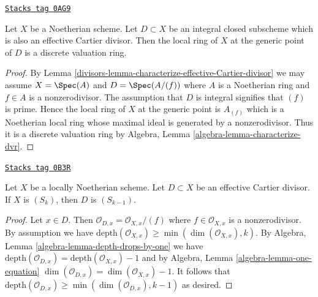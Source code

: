 \begin{lemma}
\label{divisors-lemma-integral-effective-Cartier-divisor-dvr}
\href{https://stacks.math.columbia.edu/tag/0AG9}{\texttt{Stacks tag 0AG9}}

Let $X$ be a Noetherian scheme. Let $D \subset X$ be an
integral closed subscheme which is also an
effective Cartier divisor. Then the local ring of $X$
at the generic point of $D$ is a discrete valuation ring.
\end{lemma}

\begin{proof}

By Lemma \ref{divisors-lemma-characterize-effective-Cartier-divisor}
we may assume $X = \Spec(A)$ and $D = \Spec(A/(f))$
where $A$ is a Noetherian ring and $f \in A$ is a nonzerodivisor.
The assumption that $D$ is integral signifies that $(f)$ is prime.
Hence the local ring of $X$ at the generic point is $A_{(f)}$
which is a Noetherian local ring whose maximal ideal is generated by
a nonzerodivisor. Thus it is a discrete valuation ring by
Algebra, Lemma \ref{algebra-lemma-characterize-dvr}.
\end{proof}

\begin{lemma}
\label{divisors-lemma-effective-Cartier-divisor-Sk}
\href{https://stacks.math.columbia.edu/tag/0B3R}{\texttt{Stacks tag 0B3R}}

Let $X$ be a locally Noetherian scheme. Let $D \subset X$ be an
effective Cartier divisor. If $X$ is $(S_k)$, then $D$ is $(S_{k - 1})$.
\end{lemma}

\begin{proof}
Let $x \in D$. Then $\mathcal{O}_{D, x} = \mathcal{O}_{X, x}/(f)$ where
$f \in \mathcal{O}_{X, x}$ is a nonzerodivisor. By assumption we have
$\text{depth}(\mathcal{O}_{X, x}) \geq \min(\dim(\mathcal{O}_{X, x}), k)$.
By Algebra, Lemma \ref{algebra-lemma-depth-drops-by-one} we have
$\text{depth}(\mathcal{O}_{D, x}) = \text{depth}(\mathcal{O}_{X, x}) - 1$
and by Algebra, Lemma \ref{algebra-lemma-one-equation}
$\dim(\mathcal{O}_{D, x}) = \dim(\mathcal{O}_{X, x}) - 1$.
It follows that
$\text{depth}(\mathcal{O}_{D, x}) \geq \min(\dim(\mathcal{O}_{D, x}), k - 1)$
as desired.
\end{proof}

